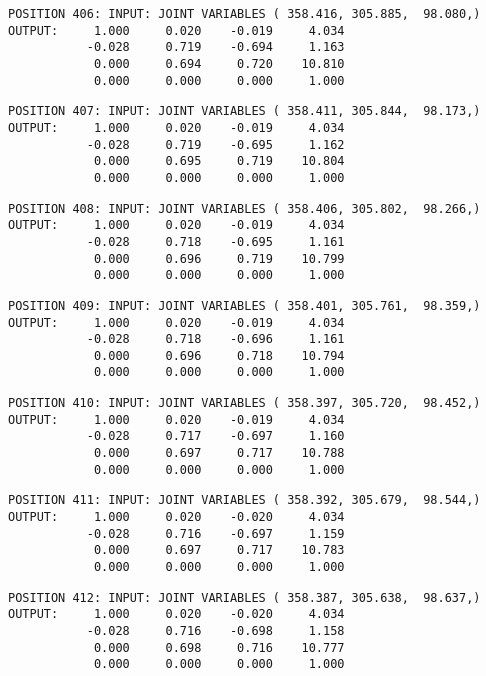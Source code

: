 \begin{verbatim}
POSITION 406: INPUT: JOINT VARIABLES ( 358.416, 305.885,  98.080,)
OUTPUT:     1.000     0.020    -0.019     4.034
           -0.028     0.719    -0.694     1.163
            0.000     0.694     0.720    10.810
            0.000     0.000     0.000     1.000
\end{verbatim} \pagebreak[1]\begin{verbatim}
POSITION 407: INPUT: JOINT VARIABLES ( 358.411, 305.844,  98.173,)
OUTPUT:     1.000     0.020    -0.019     4.034
           -0.028     0.719    -0.695     1.162
            0.000     0.695     0.719    10.804
            0.000     0.000     0.000     1.000
\end{verbatim} \pagebreak[1]\begin{verbatim}
POSITION 408: INPUT: JOINT VARIABLES ( 358.406, 305.802,  98.266,)
OUTPUT:     1.000     0.020    -0.019     4.034
           -0.028     0.718    -0.695     1.161
            0.000     0.696     0.719    10.799
            0.000     0.000     0.000     1.000
\end{verbatim} \pagebreak[1]\begin{verbatim}
POSITION 409: INPUT: JOINT VARIABLES ( 358.401, 305.761,  98.359,)
OUTPUT:     1.000     0.020    -0.019     4.034
           -0.028     0.718    -0.696     1.161
            0.000     0.696     0.718    10.794
            0.000     0.000     0.000     1.000
\end{verbatim} \pagebreak[1]\begin{verbatim}
POSITION 410: INPUT: JOINT VARIABLES ( 358.397, 305.720,  98.452,)
OUTPUT:     1.000     0.020    -0.019     4.034
           -0.028     0.717    -0.697     1.160
            0.000     0.697     0.717    10.788
            0.000     0.000     0.000     1.000
\end{verbatim} \pagebreak[1]\begin{verbatim}
POSITION 411: INPUT: JOINT VARIABLES ( 358.392, 305.679,  98.544,)
OUTPUT:     1.000     0.020    -0.020     4.034
           -0.028     0.716    -0.697     1.159
            0.000     0.697     0.717    10.783
            0.000     0.000     0.000     1.000
\end{verbatim} \pagebreak[1]\begin{verbatim}
POSITION 412: INPUT: JOINT VARIABLES ( 358.387, 305.638,  98.637,)
OUTPUT:     1.000     0.020    -0.020     4.034
           -0.028     0.716    -0.698     1.158
            0.000     0.698     0.716    10.777
            0.000     0.000     0.000     1.000
\end{verbatim} \pagebreak[1]\begin{verbatim}

\end{verbatim}
